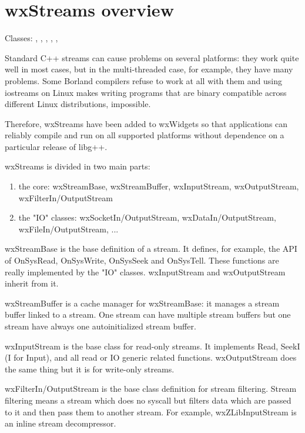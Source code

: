 \section{wxStreams overview}\label{wxstreamoverview}

Classes: ,
 , ,
 ,
 ,


Standard C++ streams can cause problems on several platforms:
they work quite well in most cases, but in the multi-threaded case, for example,
they have many problems. Some Borland compilers refuse to work at all
with them and using iostreams on Linux makes writing programs that are
binary compatible across different Linux distributions, impossible.

Therefore, wxStreams have been added to wxWidgets so that applications can
reliably compile and run on all supported platforms without dependence on a
particular release of libg++.

wxStreams is divided in two main parts:

\begin{enumerate}\itemsep=0pt
\item the core: wxStreamBase, wxStreamBuffer, wxInputStream, wxOutputStream,
wxFilterIn/OutputStream
\item the "IO" classes: wxSocketIn/OutputStream, wxDataIn/OutputStream, wxFileIn/OutputStream, ...
\end{enumerate}

wxStreamBase is the base definition of a stream. It defines, for example,
the API of OnSysRead, OnSysWrite, OnSysSeek and OnSysTell. These functions 
are really implemented by the "IO" classes.
wxInputStream and wxOutputStream inherit from it.

wxStreamBuffer is a cache manager for wxStreamBase: it manages a stream buffer
linked to a stream. One stream can have multiple stream buffers  but one stream
have always one autoinitialized stream buffer.

wxInputStream is the base class for read-only streams. It implements Read,
SeekI (I for Input), and all read or IO generic related functions.
wxOutputStream does the same thing but it is for write-only streams.

wxFilterIn/OutputStream is the base class definition for stream filtering.
Stream filtering means a stream which does no syscall but filters data
which are passed to it and then pass them to another stream.
For example, wxZLibInputStream is an inline stream decompressor.

